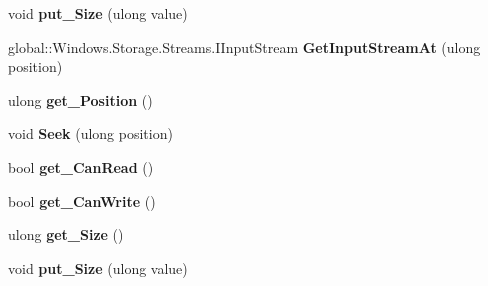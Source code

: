 \begin{DoxyCompactItemize}
void {\bfseries put\+\_\+\+Size} (ulong value)
\item 
\mbox{\label{interface_windows_1_1_storage_1_1_streams_1_1_i_random_access_stream_a937b4579f3c69b8f3e102e47786cd661}} 
global\+::\+Windows.\+Storage.\+Streams.\+I\+Input\+Stream {\bfseries Get\+Input\+Stream\+At} (ulong position)
\item 
\mbox{\label{interface_windows_1_1_storage_1_1_streams_1_1_i_random_access_stream_aac0ed113bee77668c3882dd6d533c50e}} 
ulong {\bfseries get\+\_\+\+Position} ()
\item 
\mbox{\label{interface_windows_1_1_storage_1_1_streams_1_1_i_random_access_stream_a85c3af465abf7d76b4e63d17a6822fb0}} 
void {\bfseries Seek} (ulong position)
\item 
\mbox{\label{interface_windows_1_1_storage_1_1_streams_1_1_i_random_access_stream_ae4d5064fd211749208909f7f6fe63102}} 
bool {\bfseries get\+\_\+\+Can\+Read} ()
\item 
\mbox{\label{interface_windows_1_1_storage_1_1_streams_1_1_i_random_access_stream_a4794da7c24985d3c5fd5660548461faf}} 
bool {\bfseries get\+\_\+\+Can\+Write} ()
\item 
\mbox{\label{interface_windows_1_1_storage_1_1_streams_1_1_i_random_access_stream_a6a413a2448bfb33490c1228972b1ac8c}} 
ulong {\bfseries get\+\_\+\+Size} ()
\item 
\mbox{\label{interface_windows_1_1_storage_1_1_streams_1_1_i_random_access_stream_af1e96ffb576c8a390fa379fcb6923c44}} 
void {\bfseries put\+\_\+\+Size} (ulong value)
\item 
\mbox{\label{interface_windows_1_1_storage_1_1_streams_1_1_i_random_access_stream_a937b4579f3c69b8f3e102e47786cd661}} 

\end{DoxyCompactItemize}
